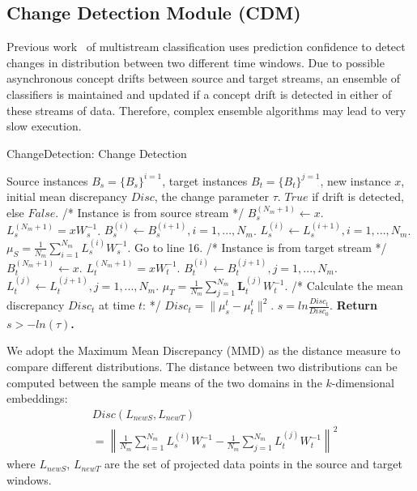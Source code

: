 \subsection{Change Detection Module (CDM)}
\label{sec:changedetection}

Previous work~\cite{chandra2016adaptive} of multistream classification uses prediction confidence to detect changes in distribution between two different time windows. Due to possible asynchronous concept drifts between source and target streams, an ensemble of classifiers is maintained and updated if a concept drift is detected in either of these streams of data. Therefore, complex ensemble algorithms may lead to very slow execution.

\begin{algorithm}[t]  
\caption{ChangeDetection: Change Detection}  
\label{alg::detection}  
\begin{algorithmic}[1]  
\Require  
Source instances $B_s=\{B_s\}^{i=1}$, target instances $B_t=\{B_t\}^{j=1}$, new instance $x$, initial mean discrepancy $Disc$, the change parameter $\tau$.
\Ensure  
$True$ if drift is detected, else $False$.
\State /* Instance is from source stream */
\State $B_s^{(N_m+1)} \leftarrow x$.
\State $L_s^{(N_m+1)}=xW_s^{-1}$.
\State $B_s^{(i)} \leftarrow B_s^{(i+1)}, i=1,...,N_m$.
\State $L_{s}^{(i)} \leftarrow L_{s}^{(i+1)}, i=1,...,N_m$.
\State $\mu_S=\frac{1}{N_m} \sum_{i=1}^{N_m}  L_{s}^{(i)}W_s^{-1}$.
\State Go to line 16.
\EndIf
\State /* Instance is from target stream */
\State $B_t^{(N_m+1)} \leftarrow x$.
\State $L_{t}^{(N_m+1)}= xW_t^{-1}$.
\State $B_t^{(i)} \leftarrow B_t^{(j+1)}, j=1,...,N_m$.
\State $L_{t}^{(j)} \leftarrow L_{t}^{(j+1)}, j=1,...,N_m$.
\State $\mu_T=\frac{1}{N_m} \sum_{j=1}^{N_m} \mathbf L_{t}^{(j)} W_t^{-1}$.
\State /* Calculate the mean discrepancy $Disc_t$ at time $t$: */
\quad $Disc_t=\|\mu_s^t-\mu_t^t\|^2$.
\State $s=ln\frac{Disc_t}{Disc_0}$.
\State \bf{Return} $s>-ln(\tau)$.
\end{algorithmic}  
\end{algorithm}

We adopt the Maximum Mean Discrepancy (MMD) as the distance measure to compare different distributions. The distance between two distributions can be computed between the sample means of the two domains in the $k$-dimensional embeddings:
\begin{equation}
\begin{split}
&Disc(L_{newS},L_{newT})\\
&= \left\lVert \frac{1}{N_m}\sum_{i=1}^{N_m}  L_s^{(i)} W_{s}^{-1} - \frac{1}{N_m}\sum_{j=1}^{N_m}  L_t^{(j)} W_{t}^{-1}\right\rVert ^2
\end{split}
\end{equation}
where $L_{newS}$, $L_{newT}$ are the set of projected data points in the source and target windows.

